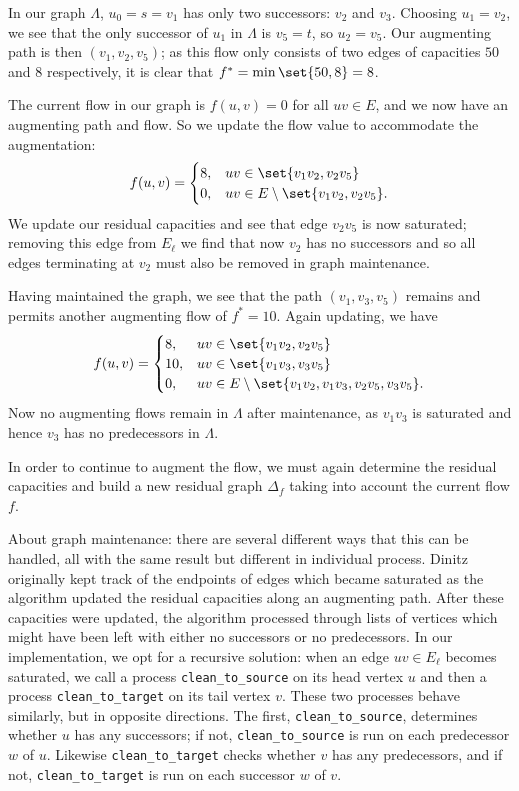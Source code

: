 \documentclass[m3380-lec-main.tex]{subfiles}
\begin{document}
\begin{exmp}
In our graph $\Lambda$, $u_0=s=v_1$ has only two successors: $v_2$ and $v_3$. Choosing $u_1=v_2$, we see that the only successor of $u_1$ in $\Lambda$ is $v_5=t$, so $u_2=v_5$. Our augmenting path is then $(v_1,v_2,v_5)$; as this flow only consists of two edges of capacities $50$ and $8$ respectively, it is clear that $f^*=\min\set{50,8}=8$.

The current flow in our graph is $f(u,v)=0$ for all $uv\in E$, and we now have an augmenting path and flow. So we update the flow value to accommodate the augmentation:
\[f(u,v) = \begin{cases}8, & uv\in\set{v_1v_2,v_2v_5} \\ 0, &uv\in E\setminus\set{v_1v_2,v_2v_5}. \end{cases}\]
We update our residual capacities and see that edge $v_2v_5$ is now saturated; removing this edge from $E_\ell$ we find that now $v_2$ has no successors and so all edges terminating at $v_2$ must also be removed in graph maintenance.

Having maintained the graph, we see that the path $(v_1,v_3,v_5)$ remains and permits another augmenting flow of $f^*=10$. Again updating, we have
\[f(u,v) = \begin{cases}
    8, & uv\in\set{v_1v_2,v_2v_5} \\
    10, & uv\in\set{v_1v_3,v_3v_5} \\
    0, &uv\in E\setminus\set{v_1v_2,v_1v_3,v_2v_5,v_3v_5}.
    \end{cases}
\]
Now no augmenting flows remain in $\Lambda$ after maintenance, as $v_1v_3$ is saturated and hence $v_3$ has no predecessors in $\Lambda$. 

In order to continue to augment the flow, we must again determine the residual capacities and build a new residual graph $\Delta_f$ taking into account the current flow $f$.
\end{exmp}

\begin{rem} About graph maintenance: there are several different ways that this can be handled, all with the same result but different in individual process. Dinitz originally kept track of the endpoints of edges which became saturated as the algorithm updated the residual capacities along an augmenting path. After these capacities were updated, the algorithm processed through lists of vertices which might have been left with either no successors or no predecessors. In our implementation, we opt for a recursive solution: when an edge $uv\in E_\ell$ becomes saturated, we  call a process \verb|clean_to_source| on its head vertex $u$ and then a process \verb|clean_to_target| on its tail vertex $v$. These two processes behave similarly, but in opposite directions. The first, \verb|clean_to_source|, determines whether $u$ has any successors; if not, \verb|clean_to_source| is run on each predecessor $w$ of $u$. Likewise \verb|clean_to_target| checks whether $v$ has any predecessors, and if not, \verb|clean_to_target| is run on each successor $w$ of $v$.
\end{rem}
\end{document}
